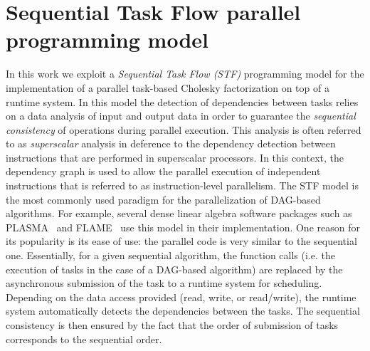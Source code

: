 \documentclass{article}
\newcommand{\lsection}[1]{\section{#1} \setcounter{equation}{0} \setcounter{figure}{0} \setcounter{table}{0} \label{#1}}
\begin{document}
\lsection{Sequential Task Flow parallel programming model}\label{sec:stf-model}

In this work we exploit a \textit{Sequential Task Flow
  (STF)} programming model for the implementation of a parallel
task-based Cholesky factorization on top of a runtime system. In this
model the detection of dependencies between tasks relies on a data
analysis of input and output data in order to guarantee the
\textit{sequential consistency} of operations during parallel
execution. This analysis is often referred to as
\textit{superscalar} analysis in deference to the dependency detection
between instructions that are performed in superscalar processors. In
this context, the dependency graph is used to allow the parallel
execution of independent instructions that is referred to as
instruction-level parallelism.
The STF model is the most commonly used paradigm for the
parallelization of DAG-based algorithms.
For example, several
dense linear algebra software packages such as
PLASMA~\cite{a.d.d.h.ea:09} and FLAME~\cite{i.c.q.q.ea:12} use this
model in their implementation. One reason for its popularity is
its ease of use: the parallel code is
very similar to the sequential one. Essentially, for a given
sequential algorithm, the
function calls (i.e. the execution of tasks in the case of a DAG-based
algorithm) are replaced by the asynchronous submission of the task to a runtime
system for scheduling. Depending on the data access
provided (read, write, or read/write), the runtime system automatically detects 
the dependencies
between the tasks. The sequential consistency is then ensured by the
fact that the order of submission of tasks corresponds to the
sequential order.
\end{document}
